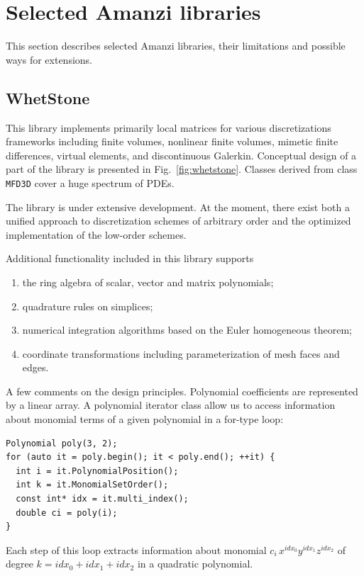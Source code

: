 
\section{Selected Amanzi libraries}

This section describes selected Amanzi libraries, their limitations and possible 
ways for extensions.

\subsection{WhetStone}
This library implements primarily local matrices for 
various discretizations frameworks including finite volumes, nonlinear finite volumes,
mimetic finite differences, virtual elements, and discontinuous Galerkin.
Conceptual design of a part of the library is presented in Fig.~\ref{fig:whetstone}.
Classes derived from class {\tt MFD3D} cover a huge spectrum of PDEs.

The library is under extensive development.
At the moment, there exist both a unified approach to discretization schemes of arbitrary
order and the optimized implementation of the low-order schemes.

Additional functionality included in this library supports
\begin{enumerate}
\item the ring algebra of scalar, vector and matrix polynomials;
\item quadrature rules on simplices;
\item numerical integration algorithms based on the Euler homogeneous theorem;
\item coordinate transformations including parameterization of mesh faces and edges.
\end{enumerate}

A few  comments on the design principles. 
Polynomial coefficients are represented by a linear array. 
A polynomial iterator class allow us to access information about monomial terms of 
a given polynomial in a for-type loop:
\begin{lstlisting}
Polynomial poly(3, 2);
for (auto it = poly.begin(); it < poly.end(); ++it) {
  int i = it.PolynomialPosition();
  int k = it.MonomialSetOrder();
  const int* idx = it.multi_index();
  double ci = poly(i);
}
\end{lstlisting}
Each step of this loop extracts information about monomial $c_i \,x^{idx_0} y^{idx_1} z^{idx_2}$
of degree $k= idx_0 + idx_1 + idx_2$ in a quadratic polynomial.

